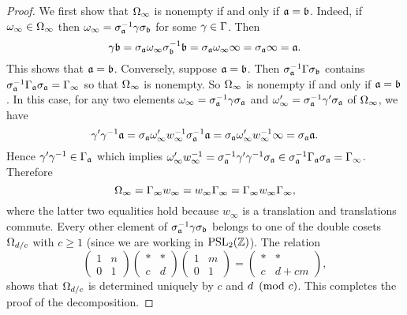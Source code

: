       \begin{proof}
        We first show that $\Omega_{\infty}$ is nonempty if and only if $\mathfrak{a} = \mathfrak{b}$. Indeed, if $\omega_{\infty} \in \Omega_{\infty}$ then $\omega_{\infty} = \sigma_{\mathfrak{a}}^{-1}\gamma\sigma_{\mathfrak{b}}$ for some $\gamma \in \Gamma$. Then
        \[
          \gamma\mathfrak{b} = \sigma_{\mathfrak{a}}\omega_{\infty}\sigma_{\mathfrak{b}}^{-1}\mathfrak{b} = \sigma_{\mathfrak{a}}\omega_{\infty}\infty = \sigma_{\mathfrak{a}}\infty = \mathfrak{a}.
        \]
        This shows that $\mathfrak{a} = \mathfrak{b}$. Conversely, suppose $\mathfrak{a} = \mathfrak{b}$. Then $\sigma_{\mathfrak{a}}^{-1}\Gamma\sigma_{\mathfrak{b}}$ contains $\sigma_{\mathfrak{a}}^{-1}\Gamma_{\mathfrak{a}}\sigma_{\mathfrak{a}} = \Gamma_{\infty}$ so that $\Omega_{\infty}$ is nonempty. So $\Omega_{\infty}$ is nonempty if and only if $\mathfrak{a} = \mathfrak{b}$. In this case, for any two elements $\omega_{\infty} = \sigma_{\mathfrak{a}}^{-1}\gamma\sigma_{\mathfrak{a}}$ and $\omega'_{\infty} = \sigma_{\mathfrak{a}}^{-1}\gamma'\sigma_{\mathfrak{a}}$ of $\Omega_{\infty}$, we have
        \[
          \gamma'\gamma^{-1}\mathfrak{a} = \sigma_{\mathfrak{a}}\omega'_{\infty}w_{\infty}^{-1}\sigma_{\mathfrak{a}}^{-1}\mathfrak{a} = \sigma_{\mathfrak{a}}\omega'_{\infty}w_{\infty}^{-1}\infty = \sigma_{\mathfrak{a}}\mathfrak{a}.
        \]
        Hence $\gamma'\gamma^{-1} \in \Gamma_{\mathfrak{a}}$ which implies $\omega'_{\infty}w_{\infty}^{-1} = \sigma_{\mathfrak{a}}^{-1}\gamma'\gamma^{-1}\sigma_{\mathfrak{a}} \in \sigma_{\mathfrak{a}}^{-1}\Gamma_{\mathfrak{a}}\sigma_{\mathfrak{a}} = \Gamma_{\infty}$. Therefore
        \[
          \Omega_{\infty} = \Gamma_{\infty}w_{\infty} = w_{\infty}\Gamma_{\infty} = \Gamma_{\infty}w_{\infty}\Gamma_{\infty},
        \]
        where the latter two equalities hold because $w_{\infty}$ is a translation and translations commute. Every other element of $\sigma_{\mathfrak{a}}^{-1}\gamma\sigma_{\mathfrak{b}}$ belongs to one of the double cosets $\Omega_{d/c}$ with $c \ge 1$ (since we are working in $\mathrm{PSL}_{2}(\mathbb{Z})$). The relation
        \[
          \begin{pmatrix} 1 & n \\ 0 & 1 \end{pmatrix}\begin{pmatrix} \ast & \ast \\ c & d \end{pmatrix}\begin{pmatrix} 1 & m \\ 0 & 1 \end{pmatrix} = \begin{pmatrix} \ast & \ast \\ c & d+cm \end{pmatrix},
        \]
        shows that $\Omega_{d/c}$ is determined uniquely by $c$ and $d \ \left(\text{mod }c\right)$. This completes the proof of the decomposition.
      \end{proof}

